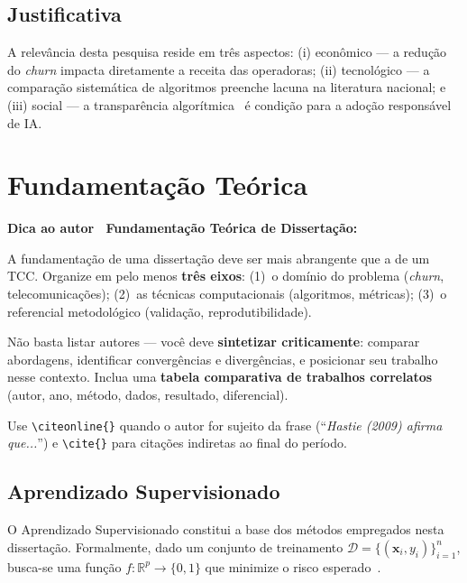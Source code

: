 \documentclass[
    12pt,
    oneside,
    a4paper,
    english,
    brazilian
    ]{abntex2}
\numberwithin{equation}{chapter}
\newenvironment{dica}{%
    \par\medskip
    \color{blue!60!black}\small\itshape
}{%
    \par\medskip
}
\begin{document}
\section{Justificativa}

A relevância desta pesquisa reside em três aspectos: (i) econômico --- a redução do \textit{churn} impacta diretamente a receita das operadoras; (ii) tecnológico --- a comparação sistemática de algoritmos preenche lacuna na literatura nacional; e (iii) social --- a transparência algorítmica~\cite{martins2024} é condição para a adoção responsável de IA.

\chapter{Fundamentação Teórica}

\begin{dica}
\noindent\textbf{Dica ao autor \textemdash\ Fundamentação Teórica de Dissertação:}

A fundamentação de uma dissertação deve ser mais abrangente que a de um TCC. Organize em pelo menos \textbf{três eixos}: (1)~o domínio do problema (\textit{churn}, telecomunicações); (2)~as técnicas computacionais (algoritmos, métricas); (3)~o referencial metodológico (validação, reprodutibilidade).

Não basta listar autores --- você deve \textbf{sintetizar criticamente}: comparar abordagens, identificar convergências e divergências, e posicionar seu trabalho nesse contexto. Inclua uma \textbf{tabela comparativa de trabalhos correlatos} (autor, ano, método, dados, resultado, diferencial).

Use \texttt{\textbackslash citeonline\{\}} quando o autor for sujeito da frase (``\textit{Hastie (2009) afirma que...}'') e \texttt{\textbackslash cite\{\}} para citações indiretas ao final do período.
\end{dica}

\section{Aprendizado Supervisionado}

O Aprendizado Supervisionado constitui a base dos métodos empregados nesta dissertação. Formalmente, dado um conjunto de treinamento $\mathcal{D} = \{(\mathbf{x}_i, y_i)\}_{i=1}^n$, busca-se uma função $f: \mathbb{R}^p \to \{0,1\}$ que minimize o risco esperado~\cite{hastie2009}.
\end{document}
